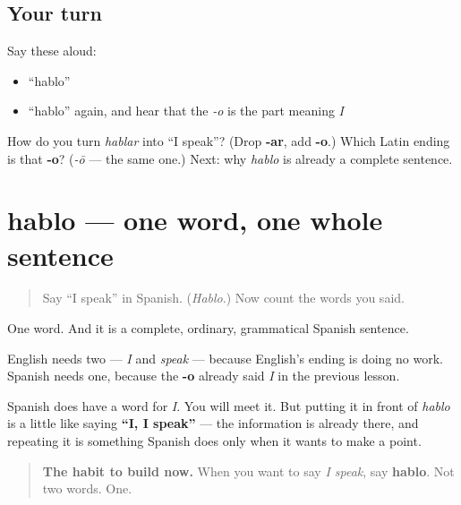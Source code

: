 \subsection*{Your turn}
Say these aloud:

\begin{itemize}
\raggedright
  \item \textquotedblleft{}hablo\textquotedblright{}
  \item \textquotedblleft{}hablo\textquotedblright{} again, and hear that the \emph{-o} is the part meaning \emph{I}
\end{itemize}

\begin{tcolorbox}[breakable,colback=teal!4,colframe=teal!35!black,title={Before you move on}]
How do you turn \emph{hablar} into \textquotedblleft{}I speak\textquotedblright{}? (Drop \textbf{-ar}, add \textbf{-o}.) Which Latin ending is that \textbf{-o}? (\emph{-ō} — the same one.) Next: why \emph{hablo} is already a complete sentence.
\end{tcolorbox}
\section[hablo]{hablo — one word, one whole sentence}

\label{lesson:ES-C06-pro-drop}



\begin{quote}
Say \textquotedblleft{}I speak\textquotedblright{} in Spanish. (\emph{Hablo}.) Now count the words you said.
\end{quote}

\begin{grammarlens}[title={Grammar Lens: the pronoun you never needed}]
One word. And it is a complete, ordinary, grammatical Spanish sentence.

English needs two — \emph{I} and \emph{speak} — because English's ending is doing no work. Spanish needs one, because the \textbf{-o} already said \emph{I} in the previous lesson.

Spanish does have a word for \emph{I}. You will meet it. But putting it in front of \emph{hablo} is a little like saying \textbf{\textquotedblleft{}I, I speak\textquotedblright{}} — the information is already there, and repeating it is something Spanish does only when it wants to make a point.

\begin{quote}
\textbf{The habit to build now.} When you want to say \emph{I speak}, say \textbf{hablo}. Not two words. One.
\end{quote}
\end{grammarlens}

